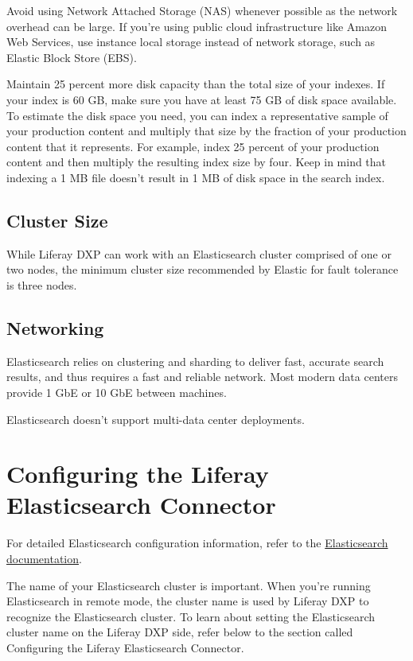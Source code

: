 Avoid using Network Attached Storage (NAS) whenever possible as the
network overhead can be large. If you're using public cloud
infrastructure like Amazon Web Services, use instance local storage
instead of network storage, such as Elastic Block Store (EBS).

Maintain 25 percent more disk capacity than the total size of your
indexes. If your index is 60 GB, make sure you have at least 75 GB of
disk space available. To estimate the disk space you need, you can index
a representative sample of your production content and multiply that
size by the fraction of your production content that it represents. For
example, index 25 percent of your production content and then multiply
the resulting index size by four. Keep in mind that indexing a 1 MB file
doesn't result in 1 MB of disk space in the search index.

\subsection{Cluster Size}\label{cluster-size}

While Liferay DXP can work with an Elasticsearch cluster comprised of
one or two nodes, the minimum cluster size recommended by Elastic for
fault tolerance is three nodes.

\subsection{Networking}\label{networking}

Elasticsearch relies on clustering and sharding to deliver fast,
accurate search results, and thus requires a fast and reliable network.
Most modern data centers provide 1 GbE or 10 GbE between machines.

Elasticsearch doesn't support multi-data center deployments.

\section{Configuring the Liferay Elasticsearch
Connector}\label{configuring-the-liferay-elasticsearch-connector}

For detailed Elasticsearch configuration information, refer to the
\href{https://www.elastic.co/guide/en/elasticsearch/reference/6.5/settings.html}{Elasticsearch
documentation}.

The name of your Elasticsearch cluster is important. When you're running
Elasticsearch in remote mode, the cluster name is used by Liferay DXP to
recognize the Elasticsearch cluster. To learn about setting the
Elasticsearch cluster name on the Liferay DXP side, refer below to the
section called Configuring the Liferay Elasticsearch Connector.


